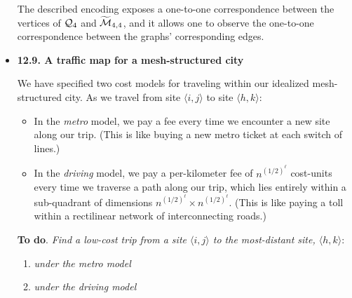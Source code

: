 \begin{itemize}
\medskip

The described encoding exposes a one-to-one correspondence between the vertices of  $\mbox{$\cal Q$}_4$ and $\widetilde{\mbox{$\cal M$}}_{4,4}$, and it allows one to observe the one-to-one correspondence between the graphs' corresponding edges.


\medskip\item
{\bf 12.9. A traffic map for a mesh-structured city}
\smallskip

We have specified two cost models for traveling within our idealized mesh-structured city.  As we travel from site $\langle i,j \rangle$ to site $\langle h,k \rangle$:
  \begin{itemize}
  \item
In the {\em metro} model, we pay a fee every time we encounter a new site along our trip.  (This is like buying a new metro ticket at each switch of lines.)
  \medskip\item
In the {\em driving} model, we pay a per-kilometer fee of $n^{(1/2)^\ell}$ cost-units every time we traverse a path along our trip, which lies entirely within a sub-quadrant of dimensions
$n^{(1/2)^\ell} \times n^{(1/2)^\ell}$.  (This is like paying a toll within a rectilinear network of interconnecting roads.)
  \end{itemize}

\medskip

{\bf To do}.
{\em Find a low-cost trip from a site $\langle i,j \rangle$ to the most-distant site, $\langle h,k \rangle$}:
\begin{enumerate}
\item
{\em under the metro model}
\medskip\item
{\em under the driving model}
\end{enumerate}

\medskip


\end{itemize}
